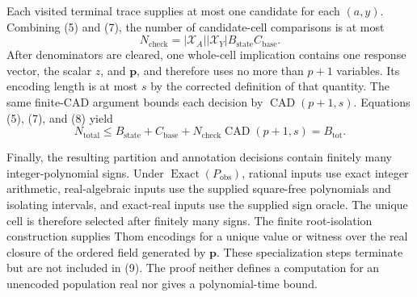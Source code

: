 Each visited terminal trace supplies at most one candidate for each \((a,y)\). Combining (5) and (7), the number of candidate-cell comparisons is at most
\[
N_{\mathrm{check}}
=|\mathcal X_A||\mathcal X_Y|B_{\mathrm{state}}C_{\mathrm{base}}.
\tag{8}
\]
After denominators are cleared, one whole-cell implication contains one response vector, the scalar \(z\), and \(\mathbf p\), and therefore uses no more than \(p+1\) variables. Its encoding length is at most \(s\) by the corrected definition of that quantity. The same finite-CAD argument bounds each decision by \(\operatorname{CAD}(p+1,s)\). Equations (5), (7), and (8) yield
\[
N_{\mathrm{total}}
\leq B_{\mathrm{state}}+C_{\mathrm{base}}
+N_{\mathrm{check}}\operatorname{CAD}(p+1,s)
=B_{\mathrm{tot}}.
\tag{9}
\]

Finally, the resulting partition and annotation decisions contain finitely many integer-polynomial signs. Under \(\operatorname{Exact}(P_{\mathrm{obs}})\), rational inputs use exact integer arithmetic, real-algebraic inputs use the supplied square-free polynomials and isolating intervals, and exact-real inputs use the supplied sign oracle. The unique cell is therefore selected after finitely many signs. The finite root-isolation construction supplies Thom encodings for a unique value or witness over the real closure of the ordered field generated by \(\mathbf p\). These specialization steps terminate but are not included in (9). The proof neither defines a computation for an unencoded population real nor gives a polynomial-time bound.